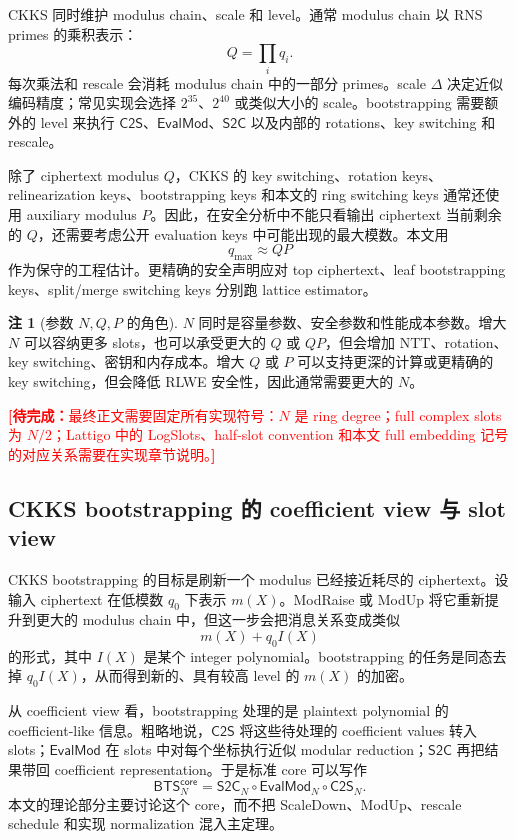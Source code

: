 \documentclass[UTF8,11pt]{article}
\newcommand{\todo}[1]{\textcolor{red}{\textbf{[待完成：}#1\textbf{]}}}
\newcommand{\CtwoS}{\mathsf{C2S}}
\newcommand{\StwoC}{\mathsf{S2C}}
\newcommand{\EvalMod}{\mathsf{EvalMod}}
\newcommand{\core}{\mathsf{core}}
\newcommand{\BTS}{\mathsf{BTS}}
\theoremstyle{definition}
\newtheorem{remark}{注}
\theoremstyle{plain}
\begin{document}
CKKS 同时维护 modulus chain、scale 和 level。通常 modulus chain 以 RNS primes 的乘积表示：
\[
Q=\prod_i q_i.
\]
每次乘法和 rescale 会消耗 modulus chain 中的一部分 primes。scale \(\Delta\) 决定近似编码精度；常见实现会选择 \(2^{35}\)、\(2^{40}\) 或类似大小的 scale。bootstrapping 需要额外的 level 来执行 \(\CtwoS\)、\(\EvalMod\)、\(\StwoC\) 以及内部的 rotations、key switching 和 rescale。

除了 ciphertext modulus \(Q\)，CKKS 的 key switching、rotation keys、relinearization keys、bootstrapping keys 和本文的 ring switching keys 通常还使用 auxiliary modulus \(P\)。因此，在安全分析中不能只看输出 ciphertext 当前剩余的 \(Q\)，还需要考虑公开 evaluation keys 中可能出现的最大模数。本文用
\[
q_{\max}\approx QP
\]
作为保守的工程估计。更精确的安全声明应对 top ciphertext、leaf bootstrapping keys、split/merge switching keys 分别跑 lattice estimator。

\begin{remark}[参数 \(N,Q,P\) 的角色]
\(N\) 同时是容量参数、安全参数和性能成本参数。增大 \(N\) 可以容纳更多 slots，也可以承受更大的 \(Q\) 或 \(QP\)，但会增加 NTT、rotation、key switching、密钥和内存成本。增大 \(Q\) 或 \(P\) 可以支持更深的计算或更精确的 key switching，但会降低 RLWE 安全性，因此通常需要更大的 \(N\)。
\end{remark}

\todo{最终正文需要固定所有实现符号：\(N\) 是 ring degree；full complex slots 为 \(N/2\)；Lattigo 中的 LogSlots、half-slot convention 和本文 full embedding 记号的对应关系需要在实现章节说明。}

\subsection{CKKS bootstrapping 的 coefficient view 与 slot view}
\label{subsec:ckks-bts-two-views}

CKKS bootstrapping 的目标是刷新一个 modulus 已经接近耗尽的 ciphertext。设输入 ciphertext 在低模数 \(q_0\) 下表示 \(m(X)\)。ModRaise 或 ModUp 将它重新提升到更大的 modulus chain 中，但这一步会把消息关系变成类似
\[
m(X)+q_0 I(X)
\]
的形式，其中 \(I(X)\) 是某个 integer polynomial。bootstrapping 的任务是同态去掉 \(q_0I(X)\)，从而得到新的、具有较高 level 的 \(m(X)\) 的加密。

从 coefficient view 看，bootstrapping 处理的是 plaintext polynomial 的 coefficient-like 信息。粗略地说，\(\CtwoS\) 将这些待处理的 coefficient values 转入 slots；\(\EvalMod\) 在 slots 中对每个坐标执行近似 modular reduction；\(\StwoC\) 再把结果带回 coefficient representation。于是标准 core 可以写作
\[
\BTS_N^{\core}
=
\StwoC_N\circ\EvalMod_N\circ\CtwoS_N.
\]
本文的理论部分主要讨论这个 core，而不把 ScaleDown、ModUp、rescale schedule 和实现 normalization 混入主定理。
\end{document}
